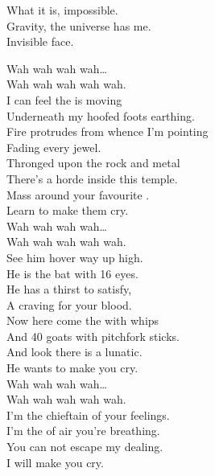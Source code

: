 What it is, impossible. \\
Gravity, the universe has me. \\
Invisible face. \\




Wah wah wah wah… \\
Wah wah wah wah wah. \\

I can feel the  is moving \\
Underneath my hoofed foots earthing. \\
Fire protrudes from whence I'm pointing \\
Fading every jewel. \\

Thronged upon the rock and metal \\
There's a horde inside this temple. \\
Mass around your favourite . \\
Learn to make them cry. \\

Wah wah wah wah… \\
Wah wah wah wah wah. \\

See him hover way up high. \\
He is the bat with 16 eyes. \\
He has a thirst to satisfy, \\
A craving for your blood. \\

Now here come the  with whips \\
And 40 goats with pitchfork sticks. \\
And look there is a lunatic. \\
He wants to make you cry. \\

Wah wah wah wah… \\
Wah wah wah wah wah. \\

I'm the chieftain of your feelings. \\
I'm the  of air you're breathing. \\
You can not escape my dealing. \\
I will make you cry. \\

